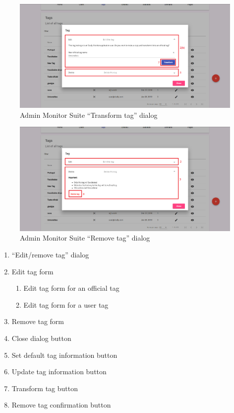 \begin{figure}[H]
    \centering
    \includegraphics[width=\linewidth]{lib/images/admin/admin_transform_tag_dialog.png}
    \caption{Admin Monitor Suite ``Transform tag'' dialog}
    \label{fig:admin_transform_tag_dialog}
\end{figure}

\begin{figure}[H]
    \centering
    \includegraphics[width=\linewidth]{lib/images/admin/admin_remove_tag_dialog.png}
    \caption{Admin Monitor Suite ``Remove tag'' dialog}
    \label{fig:admin_remove_tag_dialog}
\end{figure}

\begin{enumerate}
    \item ``Edit/remove tag'' dialog
    \item Edit tag form
    \begin{enumerate}
        \item Edit tag form for an official tag
        \item Edit tag form for a user tag
    \end{enumerate}
    \item Remove tag form
    \item Close dialog button
    \item Set default tag information button
    \item Update tag information button
    \item Transform tag button
    \item Remove tag confirmation button
\end{enumerate}

